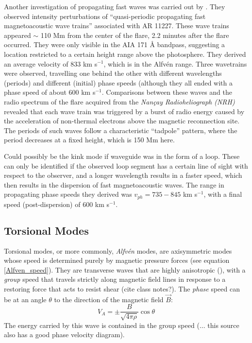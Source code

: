 \documentclass[preprint2]{aastex}
\begin{document}
Another investigation of propagating fast waves was carried out by
\cite{pfw_2}.
They observed intensity perturbations of ``quasi-periodic propagating fast
magnetoacoustic wave trains'' associated with AR 11227.
These wave trains appeared $\sim$ 110 Mm from the center of the flare,
2.2 minutes after the flare occurred.
They were only visible in the AIA 171 \AA{} bandpass, suggesting a
location restricted to a certain height range above the photosphere.
They derived an average velocity of
833 km s$^{-1}$, which is in the Alfv\'en range.
Three wavetrains were observed, travelling one behind the other
with different wavelengths (periods) and different (initial) phase
speeds (although they all ended with a phase speed of about 600 km s$^{-1}$.
Comparisons between these waves and the radio spectrum of the flare
acquired from the \emph{Nan\c{c}ay Radioheliograph (NRH)}
revealed that each wave train was triggered by a burst of radio energy
caused by the acceleration of non-thermal electrons above the
magnetic reconnection site. The periods of such waves follow a
characteristic ``tadpole'' pattern, where the period decreases at
a fixed height, which is 150 Mm here.

Could possibly be the kink mode if waveguide was in
the form of a loop. These can only be identified if the observed loop
segment has a certain line of sight with respect to the observer,
and a longer wavelength results in a faster speed, which then results
in the dispersion of fast magnetoacoustic waves. The range in
propagating phase speeds they derived was
$ v_{ph} = 735 - 845 $ km s$^{-1}$, with a final speed
(post-dispersion) of 600 km s$^{-1}$.


\subsection{Torsional Modes}
Torsional modes, or more commonly, \emph{Alfv\'en} modes, are axisymmetric
modes whose speed is determined purely by magnetic pressure forces
(see equation \ref{Alfven_speed}).
They are transverse waves that are highly anisotropic (\cite{Goossens}),
with a \emph{group} speed that
travels strictly along magnetic field lines in response
to a restoring force that acts to resist shear (cite class notes?).
The \emph{phase} speed can be at an angle $\theta$ to the direction
of the magnetic field $\vec{B}$:
\begin{equation}
    V_A = \pm \frac{B}{\sqrt{4\pi\rho}}\cos\theta
\end{equation}
The energy carried by this wave is contained in the group speed
(\cite{Somov}$\ldots$ this source also has a good phase velocity
diagram).
\end{document}

